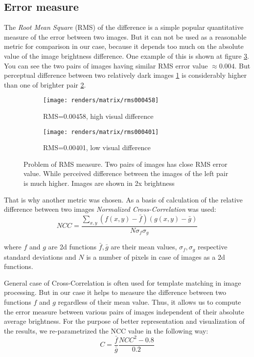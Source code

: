 \subsection{Error measure}
\label{section:error_measure}
The \emph{Root Mean Square} (RMS) of the difference is a simple popular quantitative measure of the
error between two images. But it can not be used as a reasonable metric for comparison in our case,
because it depends too much on the absolute value of the image brightness difference. One example of
this is shown at figure \ref{fig:wrong_rms}. You can see the two pairs of images having similar RMS
error value $\approx 0.004$. But perceptual difference between two relatively dark images
\ref{fig:wrong_rms_dark} is considerably higher than one of brighter pair
\ref{fig:wrong_rms_bright}.
\begin{figure}[h]
    \centering
    \begin{subfigure}{0.4\textwidth}
        \texttt{[image: renders/matrix/rms000458]}
        \caption{RMS=0.00458, high visual difference}
        \label{fig:wrong_rms_dark}
    \end{subfigure}
    \begin{subfigure}{0.4\textwidth}
        \texttt{[image: renders/matrix/rms000401]}
        \caption{RMS=0.00401, low visual difference}
        \label{fig:wrong_rms_bright}
    \end{subfigure}
    \caption{Problem of RMS measure. Two pairs of images has close RMS error value. While perceived
    difference between the images of the left pair is much higher. Images are shown in 2x
    brightness}
    \label{fig:wrong_rms}
\end{figure}

That is why another metric was chosen. As a basis of calculation of the relative difference
between two images \emph{Normalized Cross-Correlation} was used:
\[
NCC = \frac{\sum_{x,y} (f(x,y)-\bar{f})(g(x,y)-\bar{g})}{N\sigma_f\sigma_g}
\]

where $f$ and $g$ are 2d functions $\bar{f}, \bar{g}$ are their mean values, $\sigma_f,\sigma_g$
respective standard deviations and $N$ is a number of pixels in case of images as a 2d functions.

General case of Cross-Correlation is often used for template matching in image processing. But in
our case it helps to measure the difference between two functions $f$ and $g$ regardless of their
mean value. Thus, it allows us to compute the error measure between various pairs of images
independent of their absolute average brightness. For the purpose of better representation and
visualization of the results, we re-parametrized the NCC value in the following way:
\[
C = \frac{\bar{f}}{\bar{g}}\frac{NCC^2-0.8}{0.2}
\]


